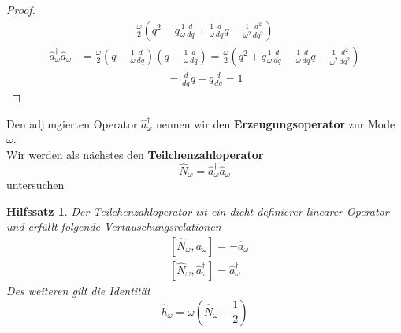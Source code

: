 \documentclass[11pt,a4paper,leqno]{report}
\newtheorem{lemma}[theorem]{Hilfssatz}
\numberwithin{equation}{chapter}
\begin{document}
\begin{proof}
\begin{align*}
	\frac{\omega}{2}(q^2 - q\frac{1}{\omega}\frac{d}{dq} + \frac{1}{\omega}\frac{d}{dq}q -\frac{1}{\omega^2}\frac{d^2}{dq^2})
\end{align*}
\begin{align}
	\hat{a}_\omega^\dagger\hat{a}_\omega &= 
	\frac{\omega}{2}(q - \frac{1}{\omega}\frac{d}{dq})(q + \frac{1}{\omega}\frac{d}{dq})=
	\frac{\omega}{2}(q^2 + q\frac{1}{\omega}\frac{d}{dq} - \frac{1}{\omega}\frac{d}{dq}q -\frac{1}{\omega^2}\frac{d^2}{dq^2})
\end{align}
\begin{align*}
	[\hat{a}_\omega,\hat{a}_\omega^\dagger] =\frac{d}{dq}q-q\frac{d}{dq} = 1
\end{align*}
\end{proof}
\noindent
Den adjungierten Operator $\hat{a}_\omega^\dagger$ nennen wir den \textbf{Erzeugungsoperator} zur Mode $\omega$.\\
Wir werden als n\"achstes den \textbf{Teilchenzahloperator}
\begin{equation}
	\hat{N}_\omega =\hat{a}^\dagger_\omega\hat{a}_\omega
\end{equation}
untersuchen
\begin{lemma}
	Der Teilchenzahloperator ist ein dicht definierer linearer Operator und erf\"ullt folgende Vertauschungsrelationen
	\begin{align}
		& [\hat{N}_\omega, \hat{a}_\omega] = -\hat{a}_\omega\\
		& [\hat{N}_\omega, \hat{a}^\dagger_\omega] = \hat{a}^\dagger_\omega
	\end{align}
	Des weiteren gilt die Identit\"at
\begin{equation}
	\hat{h}_\omega = \omega (\hat{N}_\omega + \frac{1}{2})
\end{equation}
\end{lemma}
\end{document}
